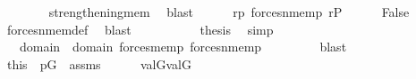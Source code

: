 \begin{isabellebody}
\ \ \ \ \ \ \isamarkupfalse%
\ strengthening{\isacharunderscore}{\kern0pt}mem\ \isamarkupfalse%
\ blast\isanewline
\ \ \ \ \isamarkupfalse%
\ {\isacartoucheopen}r{\isasympreceq}p{\isacartoucheclose}\ {\isacartoucheopen}forces{\isacharunderscore}{\kern0pt}nmem{\isacharparenleft}{\kern0pt}p{\isacharcomma}{\kern0pt}{\isasymsigma}{\isacharcomma}{\kern0pt}{\isasymtheta}{\isacharparenright}{\kern0pt}{\isacartoucheclose}\ {\isacartoucheopen}r{\isasymin}P{\isacartoucheclose}\isanewline
\ \ \ \ \isamarkupfalse%
\ {\isachardoublequoteopen}False{\isachardoublequoteclose}\isanewline
\ \ \ \ \ \ \isamarkupfalse%
\ forces{\isacharunderscore}{\kern0pt}nmem{\isacharunderscore}{\kern0pt}def\ \isamarkupfalse%
\ blast\isanewline
\ \ \ \ \isamarkupfalse%
\isanewline
\ \ \ \ \isamarkupfalse%
\ {\isacharquery}{\kern0pt}thesis\ \isamarkupfalse%
\ simp\isanewline
\ \ \isamarkupfalse%
\ \isanewline
\ \ \ \ \isamarkupfalse%
\ {}\isanewline
\ \ \ \ \isamarkupfalse%
\isanewline
\ \ \ \ \isamarkupfalse%
\ {\isasymsigma}\ \ {\isachardoublequoteopen}{\isasymsigma}{\isasymin}domain{\isacharparenleft}{\kern0pt}{\isasymtau}{\isacharparenright}{\kern0pt}\ {\isasymunion}\ domain{\isacharparenleft}{\kern0pt}{\isasymtheta}{\isacharparenright}{\kern0pt}{\isachardoublequoteclose}\ {\isachardoublequoteopen}forces{\isacharunderscore}{\kern0pt}mem{\isacharparenleft}{\kern0pt}p{\isacharcomma}{\kern0pt}{\isasymsigma}{\isacharcomma}{\kern0pt}{\isasymtheta}{\isacharparenright}{\kern0pt}{\isachardoublequoteclose}\ {\isachardoublequoteopen}forces{\isacharunderscore}{\kern0pt}nmem{\isacharparenleft}{\kern0pt}p{\isacharcomma}{\kern0pt}{\isasymsigma}{\isacharcomma}{\kern0pt}{\isasymtau}{\isacharparenright}{\kern0pt}{\isachardoublequoteclose}\ \isanewline
\ \ \ \ \ \ \isamarkupfalse%
\ blast\isanewline
\ \ \ \ \isamarkupfalse%
\ \isamarkupfalse%
\ this\ \ {\isacartoucheopen}p{\isasymin}G{\isacartoucheclose}\ \ assms\isanewline
\ \ \ \ \isamarkupfalse%
\ {\isachardoublequoteopen}val{\isacharparenleft}{\kern0pt}G{\isacharcomma}{\kern0pt}{\isasymsigma}{\isacharparenright}{\kern0pt}{\isasymin}val{\isacharparenleft}{\kern0pt}G{\isacharcomma}{\kern0pt}{\isasymtheta}{\isacharparenright}{\kern0pt}{\isachardoublequoteclose}\isanewline
\ \ \ \ \ \ \isamarkupfalse%

\end{isabellebody}

